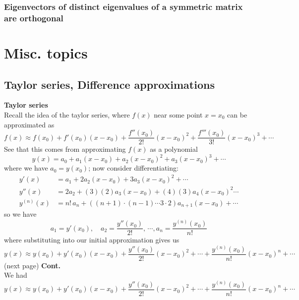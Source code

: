 \documentclass{report}
\begin{document}
\subsection{Eigenvectors of distinct eigenvalues of a symmetric matrix are orthogonal}







\newpage


\appendix
\chapter{Misc. topics}
\section{Taylor series, Difference approximations}
\textbf{Taylor series}\\
Recall the idea of the taylor series, where $f(x)$ near some point $x=x_0$ can be approximated as
\begin{equation*}
f(x)\approx f(x_0)+f'(x_0)(x-x_0)+\frac{f''(x_0)}{2!}(x-x_0)^2+\frac{f'''(x_0)}{3!}(x-x_0)^3+\cdots
\end{equation*}
See that this comes from approximating $f(x)$ as a polynomial
\begin{equation*}
y(x)=a_0+a_1(x-x_0)+a_2(x-x_0)^2+a_3(x-x_0)^3+\cdots
\end{equation*}
where we have $a_0=y(x_0)$; now consider differentiating:
\begin{align*}
y'(x)&=a_1+2a_2(x-x_0)+3a_3(x-x_0)^2+\cdots\\
y''(x)&=2a_2+(3)(2)a_3(x-x_0)+(4)(3)a_4(x-x_0)^2\cdots\\
y^{(n)}(x)&=n!\,a_n+((n+1)\cdot(n-1)\cdots3\cdot2)a_{n+1}(x-x_0)+\cdots
\end{align*}
so we have
\begin{equation*}
a_1=y'(x_0),\quad a_2=\frac{y''(x_0)}{2!},\,\cdots,a_n=\frac{y^{(n)}(x_0)}{n!}
\end{equation*}
where substituting into our initial approximation gives us
\begin{equation*}
y(x)\approx y(x_0)+y'(x_0)(x-x_0)+\frac{y''(x_0)}{2!}(x-x_0)^2+\cdots+\frac{y^{(n)}(x_0)}{n!}(x-x_0)^n+\cdots
\end{equation*}
(next page)\newpage
\noindent\textbf{Cont.}\\
We had
\begin{equation*}
y(x)\approx y(x_0)+y'(x_0)(x-x_0)+\frac{y''(x_0)}{2!}(x-x_0)^2+\cdots+\frac{y^{(n)}(x_0)}{n!}(x-x_0)^n+\cdots
\end{equation*}
\end{document}
